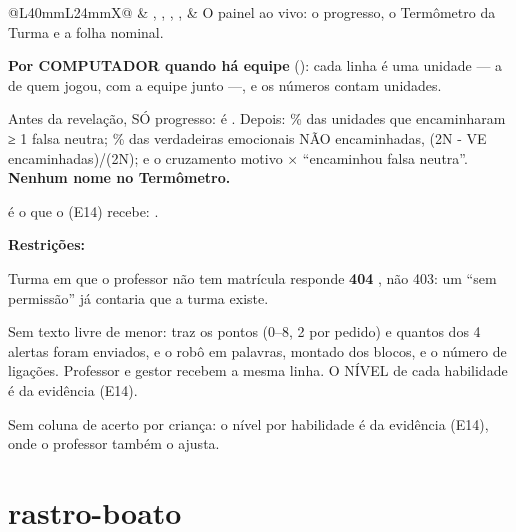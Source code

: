 \begin{tabularx}{\linewidth}{@{}L{40mm}L{24mm}X@{}}
 & , , , ,  & O painel ao vivo: o progresso, o Termômetro da Turma e a folha nominal.\par \textbf{Por COMPUTADOR quando há equipe} (): cada linha é uma unidade --- a de quem jogou, com a equipe junto ---, e os números contam unidades.\par Antes da revelação, SÓ progresso:  é . Depois: \% das unidades que encaminharam ≥ 1 falsa neutra; \% das verdadeiras emocionais NÃO encaminhadas, (2\textbullet{}N - VE encaminhadas)/(2\textbullet{}N); e o cruzamento motivo × \enquote{encaminhou falsa neutra}. \textbf{Nenhum nome no Termômetro.}\par {} é o que o  (E14) recebe: .\par \textbf{Restrições:}\par \hspace*{1em}\textbullet{} Turma em que o professor não tem matrícula responde \textbf{404} , não 403: um \enquote{sem permissão} já contaria que a turma existe.\par \hspace*{1em}\textbullet{} Sem texto livre de menor:  traz os pontos (0--8, 2 por pedido) e quantos dos 4 alertas foram enviados, e  o robô em palavras, montado dos blocos, e o número de ligações. Professor e gestor recebem a mesma linha. O NÍVEL de cada habilidade é da evidência (E14).\par \hspace*{1em}\textbullet{} Sem coluna de acerto por criança: o nível por habilidade é da evidência (E14), onde o professor também o ajusta.\\
\bottomrule
\end{tabularx}

\section{rastro-boato}


